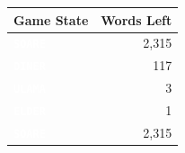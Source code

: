 \documentclass[twocolumn]{tudelft-aiaa}
\begin{document}
\begin{table}[h!]
\begin{centering}
\begin{tabular}{l r}
\bf{Game State} & \bf{Words Left}\\
\hline
\noindent \vspace{0 mm} \texttt{\textcolor{white}{\textbf{\colorbox{k}{S}\hspace{1 mm}\colorbox{k}{O}\hspace{1 mm}\colorbox{k}{A}\hspace{1 mm}\colorbox{y}{R}\hspace{1 mm}\colorbox{y}{E}\hspace{1 mm}}}} & 2,315\\
\noindent \vspace{0 mm} \texttt{\textcolor{white}{\textbf{\colorbox{y}{D}\hspace{1 mm}\colorbox{k}{I}\hspace{1 mm}\colorbox{k}{N}\hspace{1 mm}\colorbox{g}{E}\hspace{1 mm}\colorbox{g}{R}\hspace{1 mm}}}} & 117\\
\noindent \vspace{0 mm} \texttt{\textcolor{white}{\textbf{\colorbox{k}{U}\hspace{1 mm}\colorbox{g}{L}\hspace{1 mm}\colorbox{k}{A}\hspace{1 mm}\colorbox{k}{M}\hspace{1 mm}\colorbox{k}{A}\hspace{1 mm}}}} & 3\\
\noindent \vspace{0 mm} \texttt{\textcolor{white}{\textbf{\colorbox{g}{E}\hspace{1 mm}\colorbox{g}{L}\hspace{1 mm}\colorbox{g}{D}\hspace{1 mm}\colorbox{g}{E}\hspace{1 mm}\colorbox{g}{R}\hspace{1 mm}}}} & 1\\
\hline
\noindent \vspace{0 mm} \texttt{\textcolor{white}{\textbf{\colorbox{g}{S}\hspace{1 mm}\colorbox{k}{O}\hspace{1 mm}\colorbox{k}{A}\hspace{1 mm}\colorbox{k}{R}\hspace{1 mm}\colorbox{k}{E}\hspace{1 mm}}}} & 2,315\\

\end{tabular}
\end{centering}
\end{table}
\end{document}
